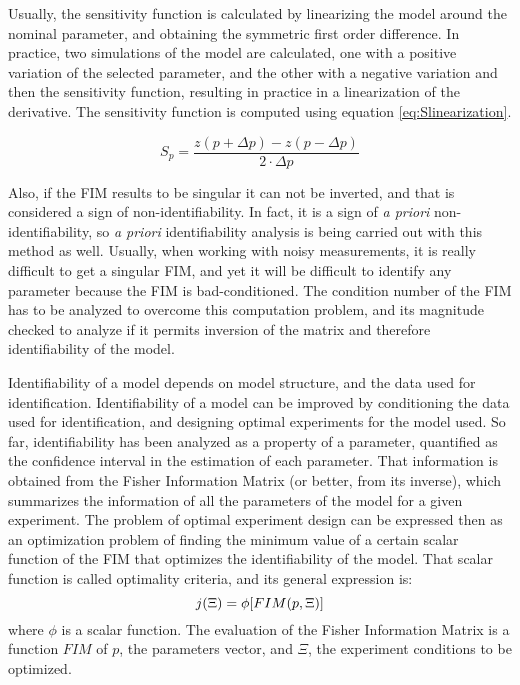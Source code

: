 Usually, the sensitivity function is calculated by linearizing the model around the nominal parameter, and obtaining the symmetric first order difference. In practice, two simulations of the model are calculated, one with a positive variation of the selected parameter, and the other with a negative variation and then the sensitivity function, resulting in practice in a linearization of the derivative. The sensitivity function is computed using equation \eqref{eq:Slinearization}.

\begin{equation}
	S_{p}=\frac{z(p+\Delta p)-z(p-\Delta p)}{2\cdot \Delta p}
\label{eq:Slinearization}
\end{equation}

Also, if the FIM results to be singular it can not be inverted, and that is considered a sign of non-identifiability. In fact, it is a sign of \textit{a priori} non-identifiability, so \textit{a priori} identifiability analysis is being carried out with this method as well. Usually, when working with noisy measurements, it is really difficult to get a singular FIM, and yet it will be difficult to identify any parameter because the FIM is bad-conditioned. The condition number of the FIM has to be analyzed to overcome this computation problem, and its magnitude checked to analyze if it permits inversion of the matrix and therefore identifiability of the model.

Identifiability of a model depends on model structure, and the data used for identification. Identifiability of a model can be improved by conditioning the data used for identification, and designing optimal experiments for the model used. So far, identifiability has been analyzed as a property of a parameter, quantified as the confidence interval in the estimation of each parameter. That information is obtained from the Fisher Information Matrix (or better, from its inverse), which summarizes the information of all the parameters of the model for a given experiment. The problem of optimal experiment design can be expressed then as an optimization problem of finding the minimum value of a certain scalar function of the FIM that optimizes the identifiability of the model. That scalar function is called optimality criteria, and its general expression is:
\begin{equation}
	j(\Xi)=\phi[FIM(p, \Xi)] \\
\label{eq:index}
\end{equation}
where $\phi$ is a scalar function. The evaluation of the Fisher Information Matrix is a function $FIM$ of $p$, the parameters vector, and $\Xi$, the experiment conditions to be optimized.

